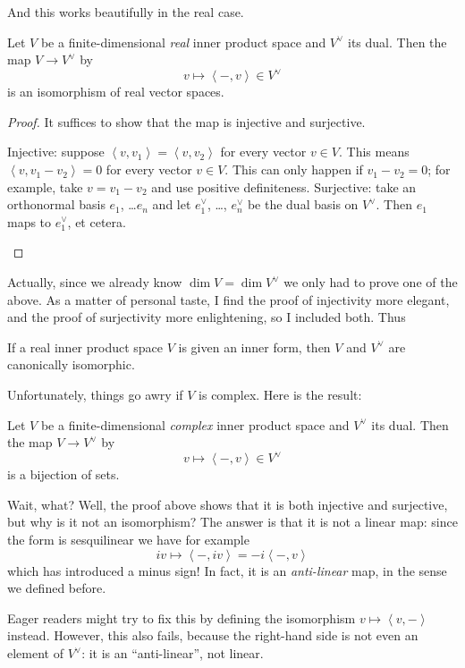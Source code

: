 And this works beautifully in the real case.
\begin{theorem}
	\label{thm:real_dual_isomorphic}
	Let $V$ be a finite-dimensional \emph{real}
	inner product space and $V^\vee$ its dual.
	Then the map $V \to V^\vee$ by
	\[ v \mapsto \left<  -, v \right> \in V^\vee \]
	is an isomorphism of real vector spaces.
\end{theorem}
\begin{proof}
	It suffices to show that the map is injective and surjective.
	\begin{itemize}
		\ii Injective: suppose $\left< v, v_1 \right> = \left< v, v_2 \right>$
		for every vector $v \in V$.
		This means $\left< v, v_1 - v_2 \right> = 0$ for every vector $v \in V$.
		This can only happen if $v_1 - v_2 = 0$; for example, take $v = v_1 - v_2$
		and use positive definiteness.
		\ii Surjective: take an orthonormal basis $e_1$, \dots $e_n$
		and let $e_1^\vee$, \dots, $e_n^\vee$ be the dual basis on $V^\vee$.
		Then $e_1$ maps to $e_1^\vee$, et cetera.
		\qedhere
	\end{itemize}
\end{proof}
Actually, since we already know $\dim V = \dim V^\vee$
we only had to prove one of the above.
As a matter of personal taste, I find the proof of injectivity more elegant,
and the proof of surjectivity more enlightening,
so I included both.
Thus
\begin{moral}
	If a real inner product space $V$ is given an inner form,
	then $V$ and $V^\vee$ are canonically isomorphic.
\end{moral}

Unfortunately, things go awry if $V$ is complex.
Here is the result:
\begin{theorem}
	Let $V$ be a finite-dimensional \emph{complex}
	inner product space and $V^\vee$ its dual.
	Then the map $V \to V^\vee$ by
	\[ v \mapsto \left<  -, v \right> \in V^\vee \]
	is a bijection of sets.
\end{theorem}
Wait, what? Well, the proof above shows that it is both injective
and surjective, but why is it not an isomorphism?
The answer is that it is not a linear map:
since the form is sesquilinear we have for example
\[ iv \mapsto \left< -, iv\right> = -i \left< -, v\right> \]
which has introduced a minus sign!
In fact, it is an \emph{anti-linear} map, in the sense we defined before.

Eager readers might try to fix this by defining
the isomorphism $v \mapsto \left< v, - \right>$ instead.
However, this also fails, because the right-hand side
is not even an element of $V^\vee$:
it is an ``anti-linear'', not linear.

